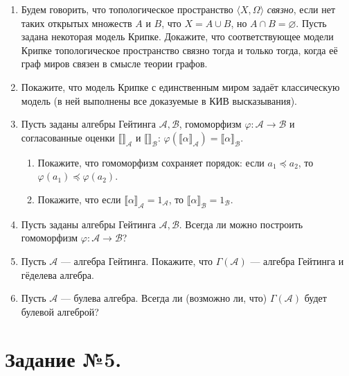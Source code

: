 \documentclass[10pt,a4paper,oneside]{article}
\begin{document}
\begin{enumerate}
\item Будем говорить, что топологическое пространство $\langle X, \Omega\rangle$ \emph{связно}, если нет таких 
открытых множеств $A$ и $B$, что $X = A \cup B$, но $A \cap B = \varnothing$. Пусть задана некоторая модель Крипке.
Докажите, что соответствующее модели Крипке топологическое пространство связно тогда и только тогда, когда её граф 
миров связен в смысле теории графов.

\item Покажите, что модель Крипке с единственным миром задаёт классическую модель (в ней выполнены
все доказуемые в КИВ высказывания).

\item Пусть заданы алгебры Гейтинга $\mathcal{A},\mathcal{B}$, гомоморфизм $\varphi: \mathcal{A} \rightarrow \mathcal{B}$
и согласованные оценки $\llbracket\rrbracket_\mathcal{A}$ и $\llbracket\rrbracket_\mathcal{B}$: 
$\varphi(\llbracket\alpha\rrbracket_\mathcal{A}) = \llbracket\alpha\rrbracket_\mathcal{B}$.
\begin{enumerate}
\item Покажите, что гомоморфизм сохраняет порядок: если $a_1\preceq a_2$, то $\varphi(a_1) \preceq \varphi(a_2)$.
\item Покажите, что если $\llbracket \alpha \rrbracket_\mathcal{A} = 1_\mathcal{A}$, то $\llbracket\alpha\rrbracket_\mathcal{B} = 1_\mathcal{B}$.
\end{enumerate}

\item Пусть заданы алгебры Гейтинга $\mathcal{A},\mathcal{B}$. Всегда ли можно построить гомоморфизм $\varphi: \mathcal{A}\rightarrow\mathcal{B}$?

\item Пусть $\mathcal{A}$ --- алгебра Гейтинга. Покажите, что $\Gamma(\mathcal{A})$ --- алгебра Гейтинга и гёделева алгебра.

\item Пусть $\mathcal{A}$ --- булева алгебра. Всегда ли (возможно ли, что) $\Gamma(\mathcal{A})$ будет булевой алгеброй?
\end{enumerate}

\section*{Задание №5.}
\end{document}
